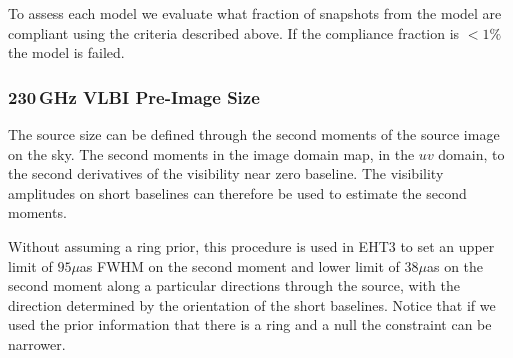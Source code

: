 
To assess each model we evaluate what fraction of snapshots from the model are compliant using the criteria described above.  If the compliance fraction is $< 1\%$ the model is failed.

\subsubsection{230\,GHz VLBI Pre-Image Size}


The source size can be defined through the second moments of the source image on the sky.  The second moments in the image domain map, in the $uv$ domain, to the second derivatives of the visibility near zero baseline.  The visibility amplitudes on short baselines can therefore be used to estimate the second moments.  


Without assuming a ring prior, this procedure is used in EHT3  to set an upper limit of $95\mu$as FWHM on the second moment and lower limit of $38\mu$as on the second moment along a particular directions through the source, with the direction determined by the orientation of the short baselines.  Notice that if we used the prior information that there is a ring and a null the constraint can be narrower.

